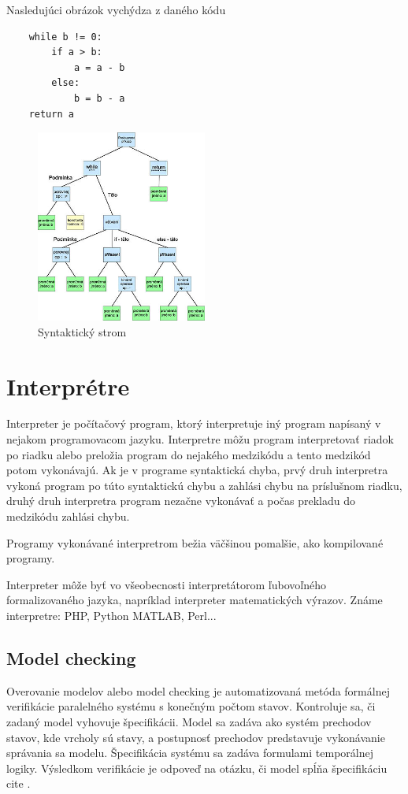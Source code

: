 Nasledujúci obrázok vychýdza z daného kódu
\begin{lstlisting}
	while b != 0:
		if a > b:
			a = a - b
		else:
			b = b - a
	return a
\end{lstlisting}

\begin{figure}[ht]
\centerline{\includegraphics[width=0.5\textwidth]{images/syntakticky_strom}}
\caption[Syntaktický strom]{Syntaktický strom}
\label{obr:tree}
\end{figure}

\section{Interprétre}
Interpreter je počítačový program, ktorý interpretuje iný program napísaný 
v nejakom programovacom jazyku. Interpretre môžu program interpretovať riadok 
po riadku alebo preložia program do nejakého medzikódu a tento medzikód potom vykonávajú. 
Ak je v programe syntaktická chyba, prvý druh interpretra vykoná program po túto syntaktickú 
chybu a zahlási chybu na príslušnom riadku, druhý druh interpretra program nezačne vykonávať a
počas prekladu do medzikódu zahlási chybu.

Programy vykonávané interpretrom bežia väčšinou pomalšie, ako kompilované programy.

Interpreter môže byť vo všeobecnosti interpretátorom ľubovoľného formalizovaného jazyka, 
napríklad interpreter matematických výrazov. Známe interpretre: PHP, Python MATLAB, Perl...

\subsection{Model checking}
Overovanie modelov alebo model checking je automatizovaná metóda formálnej verifikácie 
paralelného systému s konečným počtom stavov. Kontroluje sa, či zadaný model vyhovuje špecifikácii. 
Model sa zadáva ako systém prechodov stavov, kde vrcholy sú stavy, a postupnosť prechodov predstavuje
vykonávanie správania sa modelu. Špecifikácia systému sa zadáva formulami temporálnej logiky. 
Výsledkom verifikácie je odpoveď na otázku, či model spĺňa špecifikáciu cite \cite{br4}.

